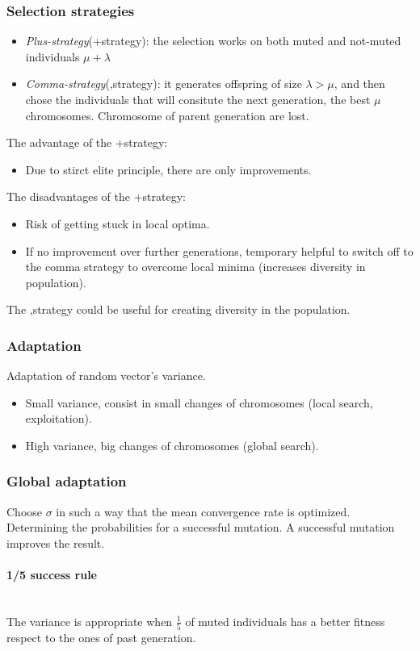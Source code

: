 \documentclass{article}
\begin{document}
\subsubsection{Selection strategies}
\begin{itemize}
    \item \textit{Plus-strategy}(+strategy): the selection works on both muted and not-muted individuals $\mu +\lambda$
    \item \textit{Comma-strategy}(,strategy): it generates offspring of size $\lambda>\mu$, and then chose the individuals
          that will consitute the next generation, the best $\mu$ chromosomes. Chromosome of parent generation
          are lost.
\end{itemize}
The advantage of the +strategy:
\begin{itemize}
    \item Due to stirct elite principle, there are only improvements.
\end{itemize}
The disadvantages of the +strategy:
\begin{itemize}
    \item Risk of getting stuck in local optima.
    \item If no improvement over further generations, temporary helpful to switch off to the
          comma strategy to overcome local minima (increases diversity in population).
\end{itemize}
The ,strategy could be useful for creating diversity in the population.
\subsubsection{Adaptation}
Adaptation of random vector's variance.
\begin{itemize}
    \item Small variance, consist in small changes of chromosomes (local search, exploitation).
    \item High variance, big changes of chromosomes (global search).
\end{itemize}

\subsubsection{Global adaptation}
Choose $\sigma$ in such a way that the mean convergence rate is optimized. Determining the probabilities
for a successful mutation. A successful mutation improves the result.
\paragraph{1/5 success rule}\mbox{}\\
The variance is appropriate when $\frac{1}{5}$ of muted individuals has a better fitness respect to
the ones of past generation.
\end{document}
